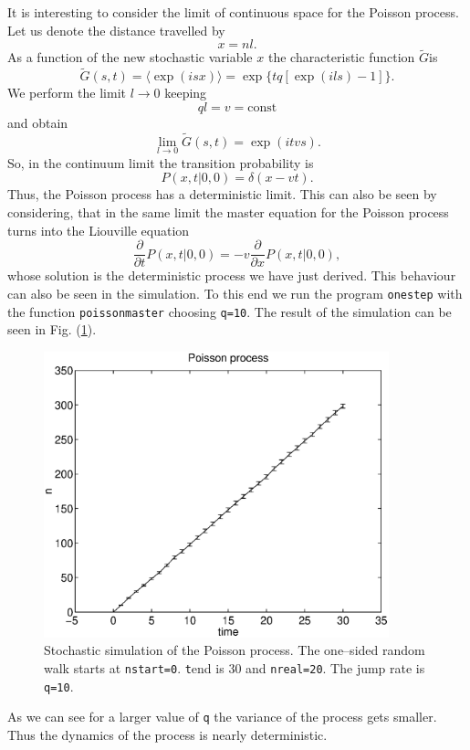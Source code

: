 It is interesting to consider the limit of continuous space for the
Poisson process. Let us denote the distance travelled by 
\begin{equation*}
x=nl.
\end{equation*}
As a function of the new stochastic variable $x$ the 
characteristic function $\tilde{G}$is
\begin{equation*}
\tilde{G}(s,t) = \langle \exp(isx) \rangle = 
     \exp\{tq[\exp(ils)-1] \}.
\end{equation*}
We perform the limit $l \longrightarrow 0$ keeping 
\begin{equation*}
ql=v=\text{const}
\end{equation*}
and obtain
\begin{equation*}
\lim_{l\rightarrow 0}\tilde{G}(s,t) = \exp(itvs).
\end{equation*}
So, in the continuum limit the transition probability is
\begin{equation*}
P(x,t|0,0) = \delta(x-vt).
\end{equation*}
Thus, the Poisson process has a deterministic limit. This can also 
be seen by considering, that in the same limit the master equation
for the Poisson process turns into the Liouville equation
\begin{equation*}
\frac{\partial}{\partial t} P(x,t|0,0) = -v 
\frac{\partial}{\partial x} P(x,t|0,0),
\end{equation*}
whose solution is the deterministic process we have just derived.
This behaviour can also be seen in the simulation. To this end
we run the program \texttt{onestep} with the function 
\texttt{poissonmaster} choosing \texttt{q=10}. The result of the 
simulation can be seen in Fig. (\ref{F_OS_POI_2}).
\begin{figure}
\label{F_OS_POI_2}
\includegraphics[width=10cm]{./Figures/f_os_poi_2.eps}
\caption{Stochastic simulation of the Poisson process. The 
one--sided random walk starts at \texttt{nstart=0}.  
{\texttt tend} is 30 and \texttt{nreal=20}.
The jump rate is \texttt{q=10}.}
\end{figure}
As we can see for a larger value of \texttt{q} the variance of the
process gets smaller. Thus the dynamics of the process is nearly 
deterministic.

